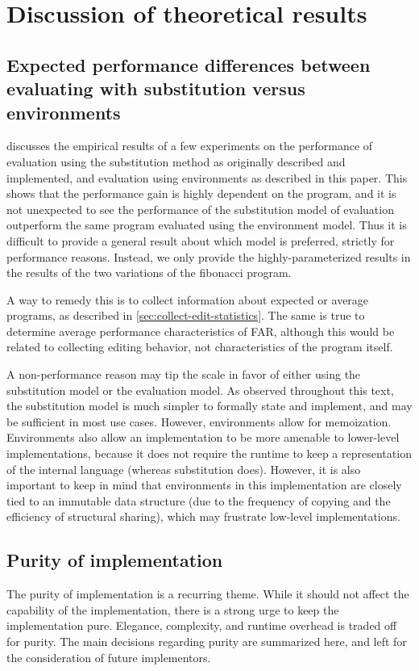 \chapter{Discussion of theoretical results}
\label{sec:discussion}

\section{Expected performance differences between evaluating with substitution versus environments}
\label{sec:expected-perf-diff}

 discusses the empirical results of a few experiments on the performance of evaluation using the substitution method as originally described and implemented, and evaluation using environments as described in this paper. This shows that the performance gain is highly dependent on the program, and it is not unexpected to see the performance of the substitution model of evaluation outperform the same program evaluated using the environment model. Thus it is difficult to provide a general result about which model is preferred, strictly for performance reasons. Instead, we only provide the highly-parameterized results in the results of the two variations of the fibonacci program.

A way to remedy this is to collect information about expected or average programs, as described in \cref{sec:collect-edit-statistics}. The same is true to determine average performance characteristics of FAR, although this would be related to collecting editing behavior, not characteristics of the program itself.

A non-performance reason may tip the scale in favor of either using the substitution model or the evaluation model. As observed throughout this text, the substitution model is much simpler to formally state and implement, and may be sufficient in most use cases. However, environments allow for memoization. Environments also allow an implementation to be more amenable to lower-level implementations, because it does not require the runtime to keep a representation of the internal language (whereas substitution does). However, it is also important to keep in mind that environments in this implementation are closely tied to an immutable data structure (due to the frequency of copying and the efficiency of structural sharing), which may frustrate low-level implementations.

\section{Purity of implementation}
\label{sec:env-purity}
The purity of implementation is a recurring theme. While it should not affect the capability of the implementation, there is a strong urge to keep the implementation pure. Elegance, complexity, and runtime overhead is traded off for purity. The main decisions regarding purity are summarized here, and left for the consideration of future implementors.

